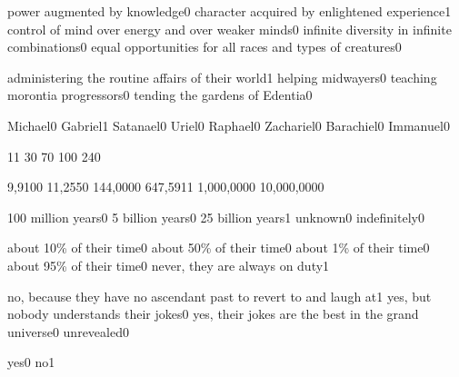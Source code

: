 
{power augmented by knowledge}{0}
{character acquired by enlightened experience}{1}
{control of mind over energy and over weaker minds}{0}
{infinite diversity in infinite combinations}{0}
{equal opportunities for all races and types of creatures}{0}
\qstop

{administering the routine affairs of their world}{1}
{helping midwayers}{0}
{teaching morontia progressors}{0}
{tending the gardens of Edentia}{0}
\qstop

{Michael}{0}
{Gabriel}{1}
{Satanael}{0}
{Uriel}{0}
{Raphael}{0}
{Zachariel}{0}
{Barachiel}{0}
{Immanuel}{0}
\qstop

{1}{1}
{3}{0}
{7}{0}
{10}{0}
{24}{0}
\qstop

{9,910}{0}
{11,255}{0}
{144,000}{0}
{647,591}{1}
{1,000,000}{0}
{10,000,000}{0}
\qstop





{100 million years}{0}
{5 billion years}{0}
{25 billion years}{1}
{unknown}{0}
{indefinitely}{0}
\qstop

{about 10\% of their time}{0}
{about 50\% of their time}{0}
{about 1\% of their time}{0}
{about 95\% of their time}{0}
{never, they are always on duty}{1}
\qstop

{no, because they have no ascendant past to revert to and laugh at}{1}
{yes, but nobody understands their jokes}{0}
{yes, their jokes are the best in the grand universe}{0}
{unrevealed}{0}
\qstop

{yes}{0}
{no}{1}
\qstop

